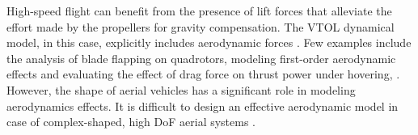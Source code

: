 High-speed flight can benefit from the presence of lift forces that alleviate the effort made by the propellers for gravity compensation. The VTOL dynamical model, in this case, explicitly includes aerodynamic forces \cite{c18}. Few examples include the analysis of blade flapping on quadrotors, modeling first-order aerodynamic effects and evaluating the effect of drag force on thrust power under hovering, \cite{c7}\cite{c20}\cite{c19}.
%
%
%
However, the shape of aerial vehicles has a significant role in modeling aerodynamics effects. It is difficult to design an effective aerodynamic model in case of complex-shaped, high DoF aerial systems \cite{c6}\cite{c18}.

%


